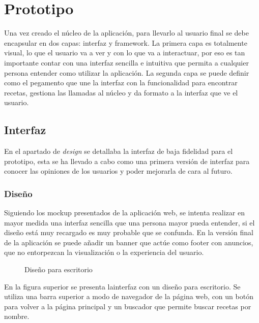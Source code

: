 \chapter{Prototipo}
Una vez creado el núcleo de la aplicación, para llevarlo al usuario final se debe encapsular en dos capas: \Gls{interfaz} y \gls{framework}. La primera capa es totalmente visual, lo que el usuario va a ver y con lo que va a interactuar, por eso es tan importante contar con una \gls{interfaz} sencilla e intuitiva que permita a cualquier persona entender como utilizar la aplicación. La segunda capa se puede definir como el pegamento que une la \gls{interfaz} con la funcionalidad para encontrar recetas, gestiona las llamadas al núcleo y da formato a la \gls{interfaz} que ve el usuario.

\section{Interfaz}
En el apartado de \textit{\gls{design}} se detallaba la interfaz de baja fidelidad para el prototipo, esta se ha llevado a cabo como una primera versión de interfaz para conocer las opiniones de los usuarios y poder mejorarla de cara al futuro.
 
\subsection{Diseño}
Siguiendo los \gls{mockup} presentados de la aplicación web, se intenta realizar en mayor medida una \gls{interfaz} sencilla que una persona mayor pueda entender, si el diseño está muy recargado es muy probable que se confunda. En la versión final de la aplicación se puede añadir un banner que actúe como footer con anuncios, que no entorpezcan la visualización o la experiencia del usuario.

\begin{figure}[h!]
\centering
{}
\caption{Diseño para escritorio}
\label{fig:escritorio}
\end{figure}
En la figura superior se presenta la\gls{interfaz} con un diseño para escritorio. Se utiliza una barra superior a modo de navegador de la página web, con un botón para volver a la página principal y un buscador que permite buscar recetas por nombre. 

